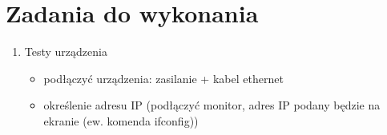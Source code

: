 \documentclass[a4paper,12pt]{extarticle}  %
\begin{document}
\section{Zadania do wykonania}
\begin{enumerate}
	\item Testy urządzenia
	      \begin{itemize}
		      \item podłączyć urządzenia: zasilanie + kabel ethernet
		            \begin{figure}[H]
			            \centering
		            \end{figure}
		      \item określenie adresu IP (podłączyć monitor, adres IP podany będzie na ekranie (ew. komenda ifconfig))
		            \begin{figure}[H]

\end{figure}
\end{itemize}
\end{enumerate}
\end{document}
